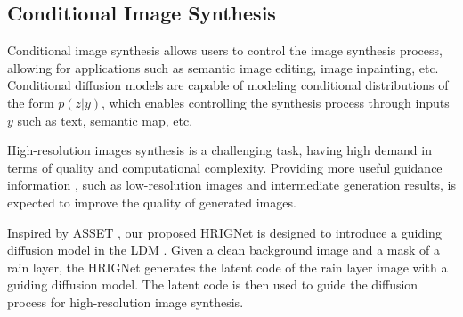 \subsection{Conditional Image Synthesis}
Conditional image synthesis allows users to control the image synthesis process, allowing for applications such as semantic image editing, image inpainting, etc. Conditional diffusion models \cite{batzolis2021conditional,rombach2022high} are capable of modeling conditional distributions of the form $p(z|y)$, which enables controlling the synthesis process through inputs $y$ such as text, semantic map, etc. 

High-resolution images synthesis is a challenging task, having high demand in terms of quality and computational complexity. Providing more useful guidance information \cite{liu2022asset,yi2020contextual,zheng2022bridging}, such as low-resolution images and intermediate generation results, is expected to improve the quality of generated images.

Inspired by ASSET \cite{liu2022asset}, our proposed HRIGNet is designed to introduce a guiding diffusion model in the LDM \cite{rombach2022high}. Given a clean background image and a mask of a rain layer, the HRIGNet generates the latent code of the rain layer image with a guiding diffusion model. The latent code is then used to guide the diffusion process for high-resolution image synthesis.